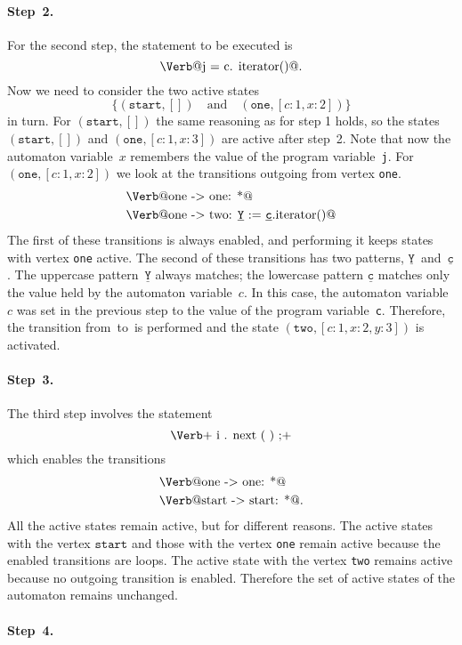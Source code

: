 \documentclass[preprint]{sigplanconf} %
\makeatletter
\newcommand{\pattern}[1]{\ensuremath{\mathtt{\underline{#1}}}}
\newcommand{\start}{\ensuremath{\mathtt{start}}\xspace}
\newcommand{\verbline}[2][]{\[\text{\Verb@#2@}#1\]}
\theoremstyle{definition}
\theoremstyle{remark}
\makeatother
\begin{document}
\paragraph{Step~2.}
For the second step, the statement to be executed is \verbline[.]{j = c.\PY{n+na}{iterator}()}
Now we need to consider the two active states \[\{(\start,[])\quad\text{and}\quad(\texttt{one},[c:1,x:2])\}\] in turn.
For $(\start,[])$ the same reasoning as for step 1 holds, so the states $(\start,[])$ and $(\mathtt{one},[c:1,x:3])$ are active after step~2.
Note that now the automaton variable~$x$ remembers the value of the program variable~{\tt j}.
For $(\texttt{one},[c:1,x:2])$ we look at the transitions outgoing from vertex {\tt one}.
\begin{align*}
&\text{\Verb@one -> one: *@} \\
&\text{\Verb@one -> two: \pattern Y := \pattern c.iterator()@}
\end{align*}
The first of these transitions is always enabled, and performing it keeps states with vertex \texttt{one} active.
The second of these transitions has two patterns, \pattern Y~and~\pattern c.
The uppercase pattern~\pattern Y always matches;
the lowercase pattern \pattern c matches only the value held by the automaton variable~$c$.
In this case, the automaton variable~$c$ was set in the previous step to the value of the program variable~\texttt{c}.
Therefore, the transition from~\Verb@one@ to~\Verb@two@ is performed and the state $(\mathtt{two},[c:1,x:2,y:3])$ is activated.

\paragraph{Step~3.}

The third step involves the statement
\[\text{\Verb+\PY{n}{i}\PY{o}{.}\PY{n+na}{next}\PY{o}{(}\PY{o}{)}\PY{o}{;}+}\]
which enables the transitions
\begin{align*}
&\text{\Verb@one -> one: *@}\\
&\text{\Verb@start -> start: *@}.
\end{align*}
All the active states remain active, but for different reasons.
The active states with the vertex \start and those with the vertex \texttt{one} remain active because the enabled transitions are loops.
The active state with the vertex \texttt{two} remains active because no outgoing transition is enabled.
Therefore the set of active states of the automaton remains unchanged.

\paragraph{Step~4.}
\end{document}

